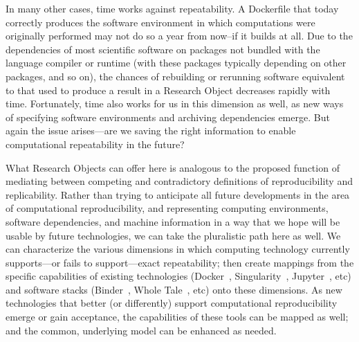 In many other cases, time works against repeatability.
A Dockerfile that today correctly produces the software environment in which computations were originally
	performed may not do so a year from now--if it builds at all.
Due to the dependencies of most scientific software on packages not
	bundled with the language compiler or runtime (with these packages typically depending on
	other packages, and so on), the chances of rebuilding or rerunning software
	equivalent to that used to produce a result in a Research Object decreases
	rapidly with time.
Fortunately, time also works for us in this dimension as well, as new ways of specifying software
	environments and archiving dependencies emerge.
But again the issue arises---are we saving the right information to enable computational repeatability
	in the future?

What Research Objects can offer here is analogous to the proposed function of mediating between competing
	and contradictory definitions of reproducibility and replicability.
Rather than trying to anticipate all future developments in the area of computational reproducibility,
	and representing computing environments, software dependencies, and machine information
	in a way that we hope will be usable by future technologies, we can take the pluralistic
	path here as well.
We can characterize the various dimensions in which computing technology currently supports---or fails to
	support---exact repeatability; then create mappings from the specific capabilities
	of existing technologies (Docker~\cite{docker2019}, Singularity~\cite{Singularity2019}, Jupyter~\cite{jupyter2019}, etc)
	and software stacks (Binder~\cite{Binder_2018}, Whole Tale~\cite{WT2019}, etc)
	onto these dimensions.
As new technologies that better (or differently) support computational reproducibility emerge or gain acceptance,
	the capabilities of these tools can be mapped as well; and the common, underlying model can be enhanced as needed.

